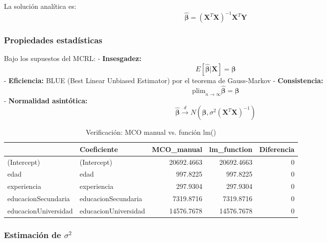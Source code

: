 \documentclass[
  oneside]{book}
\begin{document}
La solución analítica es:
\begin{equation}
\hat{\boldsymbol{\beta}} = (\mathbf{X}^{T}\mathbf{X})^{-1}\mathbf{X}^{T}\mathbf{Y}
\end{equation}

\subsubsection{Propiedades estadísticas}\label{propiedades-estaduxedsticas}

Bajo los supuestos del MCRL:
- \textbf{Insesgadez:}
\begin{equation}
E[\hat{\boldsymbol{\beta}}|\mathbf{X}] = \boldsymbol{\beta}
\end{equation}
- \textbf{Eficiencia:} BLUE (Best Linear Unbiased Estimator) por el teorema de Gauss-Markov
- \textbf{Consistencia:}
\begin{equation}
\text{plim}_{n \to \infty} \hat{\boldsymbol{\beta}} = \boldsymbol{\beta}
\end{equation}
- \textbf{Normalidad asintótica:}
\begin{equation}
\hat{\boldsymbol{\beta}} \xrightarrow{d} N(\boldsymbol{\beta}, \sigma^2(\mathbf{X}^{T}\mathbf{X})^{-1})
\end{equation}

\begin{table}
\centering
\caption{\label{tab:mco-manual}Verificación: MCO manual vs. función lm()}
\centering
\begin{tabular}[t]{l|l|r|r|r}
\hline
  & Coeficiente & MCO\_manual & lm\_function & Diferencia\\
\hline
(Intercept) & (Intercept) & 20692.4663 & 20692.4663 & 0\\
\hline
edad & edad & 997.8225 & 997.8225 & 0\\
\hline
experiencia & experiencia & 297.9304 & 297.9304 & 0\\
\hline
educacionSecundaria & educacionSecundaria & 7319.8716 & 7319.8716 & 0\\
\hline
educacionUniversidad & educacionUniversidad & 14576.7678 & 14576.7678 & 0\\
\hline
\end{tabular}
\end{table}

\subsubsection{\texorpdfstring{Estimación de \(\sigma^2\)}{Estimación de \textbackslash sigma\^{}2}}\label{estimaciuxf3n-de-sigma2}
\end{document}
